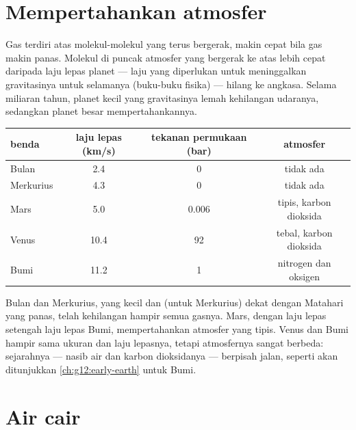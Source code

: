 \section{Mempertahankan atmosfer}

Gas terdiri atas molekul-molekul yang terus bergerak, makin cepat bila gas
makin panas. Molekul di puncak atmosfer yang bergerak ke atas lebih cepat
daripada laju lepas planet --- laju yang diperlukan untuk meninggalkan
gravitasinya untuk selamanya (buku-buku fisika) --- hilang ke angkasa. Selama
miliaran tahun, planet kecil yang gravitasinya lemah kehilangan udaranya,
sedangkan planet besar mempertahankannya.

\begin{center}
\small
\begin{tabular}{lccc}
\hline
benda & laju lepas (\unit{km/s}) & tekanan permukaan (bar) & atmosfer \\
\hline
Bulan & 2.4 & 0 & tidak ada \\
Merkurius & 4.3 & 0 & tidak ada \\
Mars & 5.0 & 0.006 & tipis, karbon dioksida \\
Venus & 10.4 & 92 & tebal, karbon dioksida \\
Bumi & 11.2 & 1 & nitrogen dan oksigen \\
\hline
\end{tabular}
\end{center}

\begin{remark}\label{rem:g10:habitable-planet:size}
Bulan dan Merkurius, yang kecil dan (untuk Merkurius) dekat dengan Matahari
yang panas, telah kehilangan hampir semua gasnya. Mars, dengan laju lepas
setengah laju lepas Bumi, mempertahankan atmosfer yang tipis. Venus dan Bumi
hampir sama ukuran dan laju lepasnya, tetapi atmosfernya sangat berbeda:
sejarahnya --- nasib air dan karbon dioksidanya --- berpisah jalan, seperti
akan ditunjukkan \cref{ch:g12:early-earth} untuk Bumi.
\end{remark}

\section{Air cair}

